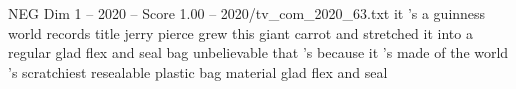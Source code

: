 \begin{textsample}{NEG Dim 1 – 2020 – Score 1.00 – 2020/tv\_com\_2020\_63.txt}  \label{ex:f1_neg_018}
it 's a guinness world records title jerry pierce grew this giant carrot and stretched it into a regular glad flex and seal bag unbelievable that 's because it 's made of the world 's scratchiest resealable plastic bag material glad flex and seal

\end{textsample}
